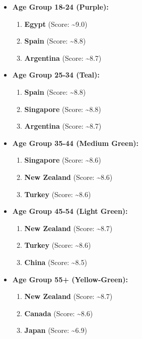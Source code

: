 \documentclass[
  letterpaper,
  DIV=11,
  numbers=noendperiod]{scrartcl}
\providecommand{\tightlist}{%
  \setlength{\itemsep}{0pt}\setlength{\parskip}{0pt}}
\begin{document}
\begin{itemize}
\tightlist
\item
  \textbf{Age Group 18-24 (Purple):}

  \begin{enumerate}
  \def\labelenumi{\arabic{enumi}.}
  \tightlist
  \item
    \textbf{Egypt} (Score: \textasciitilde9.0)
  \item
    \textbf{Spain} (Score: \textasciitilde8.8)
  \item
    \textbf{Argentina} (Score: \textasciitilde8.7)
  \end{enumerate}
\item
  \textbf{Age Group 25-34 (Teal):}

  \begin{enumerate}
  \def\labelenumi{\arabic{enumi}.}
  \tightlist
  \item
    \textbf{Spain} (Score: \textasciitilde8.8)
  \item
    \textbf{Singapore} (Score: \textasciitilde8.8)
  \item
    \textbf{Argentina} (Score: \textasciitilde8.7)
  \end{enumerate}
\item
  \textbf{Age Group 35-44 (Medium Green):}

  \begin{enumerate}
  \def\labelenumi{\arabic{enumi}.}
  \tightlist
  \item
    \textbf{Singapore} (Score: \textasciitilde8.6)
  \item
    \textbf{New Zealand} (Score: \textasciitilde8.6)
  \item
    \textbf{Turkey} (Score: \textasciitilde8.6)
  \end{enumerate}
\item
  \textbf{Age Group 45-54 (Light Green):}

  \begin{enumerate}
  \def\labelenumi{\arabic{enumi}.}
  \tightlist
  \item
    \textbf{New Zealand} (Score: \textasciitilde8.7)
  \item
    \textbf{Turkey} (Score: \textasciitilde8.6)
  \item
    \textbf{China} (Score: \textasciitilde8.5)
  \end{enumerate}
\item
  \textbf{Age Group 55+ (Yellow-Green):}

  \begin{enumerate}
  \def\labelenumi{\arabic{enumi}.}
  \tightlist
  \item
    \textbf{New Zealand} (Score: \textasciitilde8.7)
  \item
    \textbf{Canada} (Score: \textasciitilde8.6)
  \item
    \textbf{Japan} (Score: \textasciitilde6.9)
  \end{enumerate}
\end{itemize}
\end{document}
